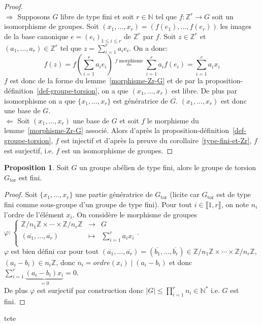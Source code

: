 \documentclass{article}
\newcommand{\Z}{\mathbb{Z}}
\newcommand{\N}{\mathbb{N}}
\newcommand{\Gt}{G_{\mathrm{tor}}}
\newcommand{\dis}{\displaystyle}
\newcommand{\nt}[1]{\llbracket  #1 \rrbracket }
\theoremstyle{definition}
\newtheorem{prop}[defi]{Proposition}
\theoremstyle{remark}
\newcommand{\app}[5]{#1:\left\{\begin{array}{rcl}
#2 & \longrightarrow & #3 \\
#4 & \longmapsto & #5  \\
\end{array}\right.
}
\begin{document}
\begin{proof}\hspace{.1em}\\
\underline{$\Rightarrow$} Supposons $G$ libre de type fini et soit $r\in\N$ tel que $f:\Z^r\to G$ soit un isomorphisme de groupes. Soit $(x_1, \ldots ,x_r)=(f(e_1),\ldots, f(e_r))$ les images de la base canonique $e=(e_i)_{1\leqslant i\leqslant r}$ de $\Z^r$ par $f$. Soit $z\in\Z^r$ et $(a_1,\ldots,a_r)\in\Z^r$ tel que $z=\dis\sum_{i=1}^r a_ie_i$. On a donc:
$$f(z)=f(\dis\sum_{i=1}^r a_i e_i)\stackrel{\textrm{$f$ morphisme}}{=}\dis\sum_{i=  1}^r a_if(e_i)=\dis\sum_{i=  1}^r a_ix_i$$
$f$ est donc de la forme du lemme~\ref{morphisme-Zr-G} et de par la proposition-d\'efinition~\ref{def-groupe-torsion}, on a que $(x_1, \ldots ,x_r)$ est libre. De plus par isomorphisme on a que $\{x_1, \ldots ,x_r\}$ est génératrice de $G$. $(x_1, \ldots ,x_r)$ est donc une base de $G$.\\
\underline{$\Leftarrow$} Soit $(x_1, \ldots ,x_r)$ une base de $G$ et soit $f$ le morphisme du lemme~\ref{morphisme-Zr-G} associ\'e. Alors d'apr\`es la proposition-d\'efinition~\ref{def-groupe-torsion}, $f$ est injectif et d'apr\`es la preuve du corollaire~\ref{type-fini-et-Zr}, $f$ est surjectif, i.e. $f$ est un isomorphisme de groupes.
\end{proof}

\begin{prop}
Soit $G$ un groupe abélien de type fini, alors le groupe de torsion $\Gt$ est fini.
\end{prop}

\begin{proof}
Soit $\{x_1, \ldots ,x_r\}$ une partie génératrice de $\Gt$ (licite car $\Gt$ est de type fini comme sous-groupe d'un groupe de type fini). Pour tout $i \in \nt{1,r}$, on note $n_i$ l'ordre de l'élément $x_i$. On considère le morphisme de groupes $\app{\varphi}{\Z/n_1\Z \times \cdots \times \Z/n_r\Z}{G}{(\overline{a_1}, \ldots, \overline{a_r})}{\dis \sum_{i=1}^r a_ix_i}$.\\
$\varphi$ est bien défini car pour tout $(\overline{a_1}, \ldots, \overline{a_r})=(\overline{b_1}, \ldots, \overline{b_r}) \in \Z/n_1\Z \times \cdots \times \Z/n_r\Z$, $(a_i-b_i)\in n_i\Z$, donc $n_i=ordre(x_i)\mid (a_i-b_i)$ et donc $\dis \sum_{i=1}^r \underbrace{(a_i-b_i)x_i}_{=0}=0$.\\
De plus $\varphi$ est surjectif par construction  donc $\vert G \vert \leqslant \dis \prod_{i=1}^r n_i \in \N^*$ i.e. $G$ est fini.
\end{proof}

tete
\end{document}
